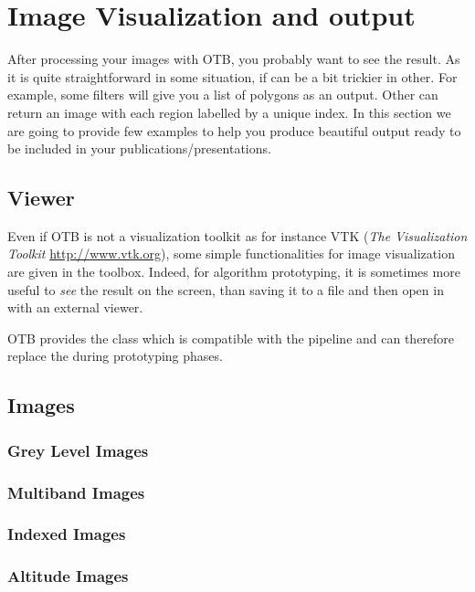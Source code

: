 \chapter{Image Visualization and output}
\label{chap:ImageVisualization}

After processing your images with OTB, you probably want to see the result. As it is quite straightforward in some situation, if can be a bit trickier in other. For example, some filters will give you a list of polygons as an output. Other can return an image with each region labelled by a unique index. In this section we are going to provide few examples to help you produce beautiful output ready to be included in your publications/presentations.


\section{Viewer}
Even if OTB is not a visualization toolkit as for instance VTK
(\emph{The Visualization Toolkit} \url{http://www.vtk.org}), some
simple functionalities for image visualization are given in the
toolbox. Indeed, for algorithm prototyping, it is sometimes more
useful to \emph{see} the result on the screen, than saving it to a
file and then open in with an external viewer.

OTB provides the  class which is compatible
with the pipeline and can therefore replace the
 during prototyping phases.




\section{Images}

\subsection{Grey Level Images}
\label{sec:ViewingGreyLevelImages}



\subsection{Multiband Images}
\label{sec:ViewingMultibandImages}



\subsection{Indexed Images}
\label{sec:ViewingIndexedImages}



\subsection{Altitude Images}
\label{sec:ViewingAltitudeImages}




